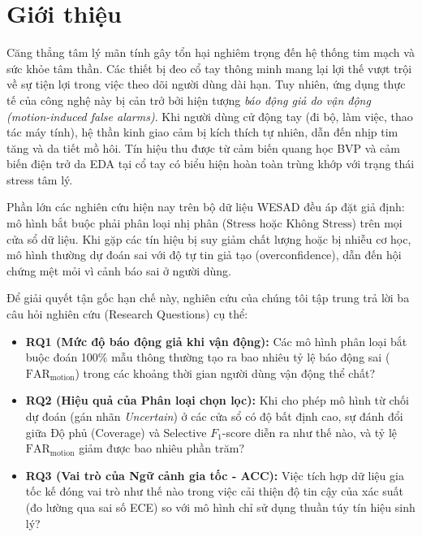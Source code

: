 \documentclass[conference]{IEEEtran}
\begin{document}
\section{Giới thiệu}
Căng thẳng tâm lý mãn tính gây tổn hại nghiêm trọng đến hệ thống tim mạch và sức khỏe tâm thần. Các thiết bị đeo cổ tay thông minh mang lại lợi thế vượt trội về sự tiện lợi trong việc theo dõi người dùng dài hạn. Tuy nhiên, ứng dụng thực tế của công nghệ này bị cản trở bởi hiện tượng \textit{báo động giả do vận động (motion-induced false alarms)}. Khi người dùng cử động tay (đi bộ, làm việc, thao tác máy tính), hệ thần kinh giao cảm bị kích thích tự nhiên, dẫn đến nhịp tim tăng và da tiết mồ hôi. Tín hiệu thu được từ cảm biến quang học BVP và cảm biến điện trở da EDA tại cổ tay có biểu hiện hoàn toàn trùng khớp với trạng thái stress tâm lý.

Phần lớn các nghiên cứu hiện nay trên bộ dữ liệu WESAD \cite{schmidt2018wesad, bobade2020stress} đều áp đặt giả định: mô hình bắt buộc phải phân loại nhị phân ($\text{Stress}$ hoặc $\text{Không Stress}$) trên mọi cửa sổ dữ liệu. Khi gặp các tín hiệu bị suy giảm chất lượng hoặc bị nhiễu cơ học, mô hình thường dự đoán sai với độ tự tin giả tạo (overconfidence), dẫn đến hội chứng mệt mỏi vì cảnh báo sai ở người dùng.

Để giải quyết tận gốc hạn chế này, nghiên cứu của chúng tôi tập trung trả lời ba câu hỏi nghiên cứu (Research Questions) cụ thể:
\begin{itemize}
    \item \textbf{RQ1 (Mức độ báo động giả khi vận động):} Các mô hình phân loại bắt buộc đoán 100\% mẫu thông thường tạo ra bao nhiêu tỷ lệ báo động sai ($\text{FAR}_{\text{motion}}$) trong các khoảng thời gian người dùng vận động thể chất?
    \item \textbf{RQ2 (Hiệu quả của Phân loại chọn lọc):} Khi cho phép mô hình từ chối dự đoán (gán nhãn \textit{Uncertain}) ở các cửa sổ có độ bất định cao, sự đánh đổi giữa Độ phủ (Coverage) và Selective $F_1$-score diễn ra như thế nào, và tỷ lệ $\text{FAR}_{\text{motion}}$ giảm được bao nhiêu phần trăm?
    \item \textbf{RQ3 (Vai trò của Ngữ cảnh gia tốc - ACC):} Việc tích hợp dữ liệu gia tốc kế đóng vai trò như thế nào trong việc cải thiện độ tin cậy của xác suất (đo lường qua sai số ECE) so với mô hình chỉ sử dụng thuần túy tín hiệu sinh lý?
\end{itemize}
\end{document}
